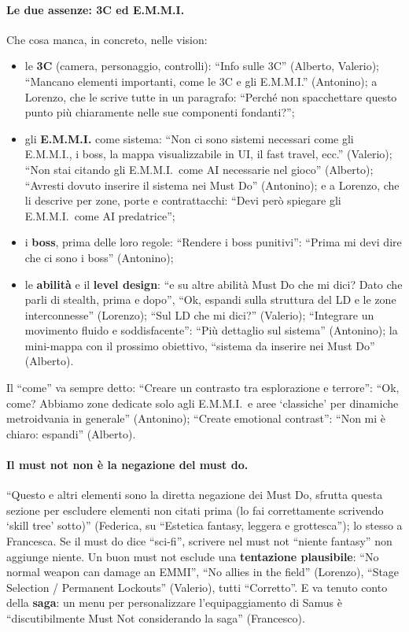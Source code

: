 \paragraph{Le due assenze: 3C ed E.M.M.I.} Che cosa manca, in concreto,
nelle vision:
\begin{itemize}
  \item le \textbf{3C} (camera, personaggio, controlli): ``Info sulle 3C''
        (Alberto, Valerio); ``Mancano elementi importanti, come le 3C e gli
        E.M.M.I.'' (Antonino); a Lorenzo, che le scrive tutte in un paragrafo:
        ``Perché non spacchettare questo punto più chiaramente nelle sue
        componenti fondanti?'';
  \item gli \textbf{E.M.M.I.} come sistema: ``Non ci sono sistemi necessari
        come gli E.M.M.I., i boss, la mappa visualizzabile in UI, il fast
        travel, ecc.'' (Valerio); ``Non stai citando gli E.M.M.I.\ come AI
        necessarie nel gioco'' (Alberto); ``Avresti dovuto inserire il sistema
        nei Must Do'' (Antonino); e a Lorenzo, che li descrive per zone, porte
        e contrattacchi: ``Devi però spiegare gli E.M.M.I.\ come AI
        predatrice'';
  \item i \textbf{boss}, prima delle loro regole: ``Rendere i boss
        punitivi'': ``Prima mi devi dire che ci sono i boss'' (Antonino);
  \item le \textbf{abilità} e il \textbf{level design}: ``e su altre abilità
        Must Do che mi dici? Dato che parli di stealth, prima e dopo'', ``Ok,
        espandi sulla struttura del LD e le zone interconnesse'' (Lorenzo);
        ``Sul LD che mi dici?'' (Valerio); ``Integrare un movimento fluido e
        soddisfacente'': ``Più dettaglio sul sistema'' (Antonino); la
        mini-mappa con il prossimo obiettivo, ``sistema da inserire nei Must
        Do'' (Alberto).
\end{itemize}
Il ``come'' va sempre detto: ``Creare un contrasto tra esplorazione e
terrore'': ``Ok, come? Abbiamo zone dedicate solo agli E.M.M.I.\ e aree
`classiche' per dinamiche metroidvania in generale'' (Antonino); ``Create
emotional contrast'': ``Non mi è chiaro: espandi'' (Alberto).

\paragraph{Il must not non è la negazione del must do.} ``Questo e altri
elementi sono la diretta negazione dei Must Do, sfrutta questa sezione per
escludere elementi non citati prima (lo fai correttamente scrivendo `skill
tree' sotto)'' (Federica, su ``Estetica fantasy, leggera e grottesca''); lo
stesso a Francesca. Se il must do dice ``sci-fi'', scrivere nel must not
``niente fantasy'' non aggiunge niente. Un buon must not esclude una
\textbf{tentazione plausibile}: ``No normal weapon can damage an EMMI'', ``No
allies in the field'' (Lorenzo), ``Stage Selection / Permanent Lockouts''
(Valerio), tutti ``Corretto''. E va tenuto conto della \textbf{saga}: un menu
per personalizzare l'equipaggiamento di Samus è ``discutibilmente Must Not
considerando la saga'' (Francesco).


